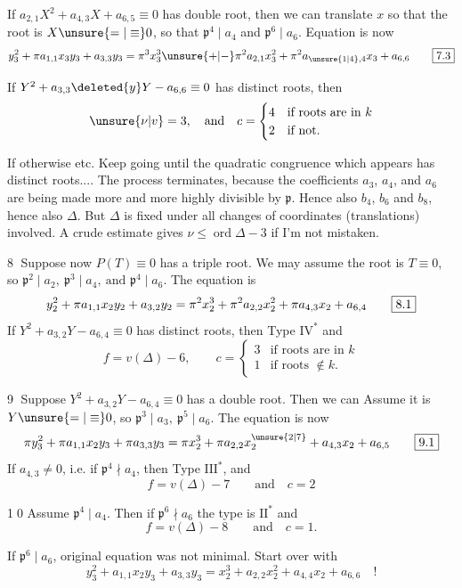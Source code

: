 \reversemarginpar
%
If $a_{2,1}X^2+a_{4,3}X+a_{6,5}\equiv0$ has double root, then we can translate $x$ so that the root is $X\unsure{=|\equiv}0$, so that $\mathfrak p^4\mid a_4$ and $\mathfrak p^6\mid a_6$. Equation is now
\[
 y_3^2+\pi a_{1,1}x_3y_3+a_{3,3}y_3
 =\pi^3x_3^3\unsure{+|-}\pi^2a_{2,1}x_3^2+\pi^2a_{\unsure{1|4},4}x_3+a_{6,6}
 \tag*{\fbox{7.3}}
\]

If $Y^2+a_{3,3}\deleted{y}Y-a_{6,6}\equiv0$ has distinct roots, then
\[
 \unsure{\nu|v}=3,\quad\text{and}\quad c=\begin{cases}
 4&\text{if roots are in }k\\
 2&\text{if not}.
 \end{cases}
\]

If otherwise  etc. Keep going until the quadratic congruence which appears has distinct roots.... The process terminates, because the coefficients $a_3$, $a_4$, and $a_6$ are being made more and more highly divisible by $\mathfrak p$. Hence also $b_4$, $b_6$ and $b_8$, hence also $\Delta$. But $\Delta$ is fixed under all changes of coordinates (translations) involved. A crude estimate gives $\nu\leq\operatorname{ord}\Delta-3$ if I'm not mistaken.

\textcircled{8} Suppose now $P(T)\equiv0$ has a triple root. We may assume the root is $T\equiv0$, so $\boxed{\mathfrak p^2\mid a_2,\ \mathfrak p^3\mid a_4,\ \text{and }\mathfrak p^4\mid a_6}$. The equation is
\[
 y_2^2+\pi a_{1,1}x_2y_2+a_{3,2}y_2
 =\pi^2x_2^3+\pi^2 a_{2,2}x_2^2+\pi a_{4,3}x_2+a_{6,4}
 \tag*{\fbox{8.1}}
\]
If $Y^2+a_{3,2}Y-a_{6,4}\equiv0$ has distinct roots, then Type $\mathrm{IV}^{*}$ and
\[
 f=v(\Delta)-6,\qquad c=\begin{cases}3&\text{if roots are in }k\\1&\text{if roots }\notin k.\end{cases}
\]

\textcircled{9} Suppose $Y^2+a_{3,2}Y-a_{6,4}\equiv0$ has a double root. Then we can Assume it is $Y\unsure{=|\equiv}0$, so $\boxed{\mathfrak p^3\mid a_3,\ \mathfrak p^5\mid a_6}$. The equation is now
\[
 \pi y_3^2+\pi a_{1,1}x_2y_3+\pi a_{3,3}y_3
 =\pi x_2^3+\pi a_{2,2}x_2^{\unsure{2|7}}+a_{4,3}x_2+a_{6,5}
 \tag*{\fbox{9.1}}
\]
If $a_{4,3}\ne0$, i.e. if $\mathfrak p^4\nmid a_4$, then Type $\mathrm{III}^{*}$, and
\[
 f=v(\Delta)-7\qquad\text{and}\quad c=2
\]

\textcircled{\scriptsize 10} Assume $\boxed{\mathfrak p^4\mid a_4}$. Then if $\mathfrak p^6\nmid a_6$ the type is $\mathrm{II}^{*}$ and
\[
 f=v(\Delta)-8\qquad\text{and}\quad c=1.
\]
\normalmarginpar

If $\mathfrak p^6\mid a_6$, original equation was not minimal. Start over with
\[
 y_3^2+a_{1,1}x_2y_3+a_{3,3}y_3=x_2^3+a_{2,2}x_2^2+a_{4,4}x_2+a_{6,6}\quad!
\]
